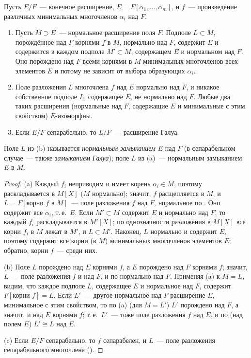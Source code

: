 \begin{proposition}
Пусть $E/F$~--- конечное расширение, $E=F[\alpha_1,\dots,\alpha_m]$, и $f$~--- произведение различных минимальных многочленов
$\alpha_i$ над $F$.
\begin{enumerate}[label=\textup{(\alph*)}]
\item Пусть $M\supset E$~--- нормальное расширение поля $F$. Подполе $L\subset M$, порождённое над $F$ корнями $f$ в $M$,
нормально над $F$, содержит $E$ и содержится в каждом подполе $M'\subset M$, содержащем $E$ и нормальном над $F$. Оно
порождено над $F$ всеми корнями в $M$ минимальных многочленов всех элементов $E$ и потому не зависит от выбора
образующих $\alpha_i$.
\item Поле разложения $L$ многочлена $f$ над $E$ нормально над $F$, и никакое собственное подполе $L$, содержащее $E$, не
нормально над $F$. Любые два таких расширения (нормальные над $F$, содержащие $E$ и минимальные с этим свойством)
$E$-изоморфны.
\item Если $E/F$ сепарабельно, то $L/F$~--- расширение Галуа.
\end{enumerate}
Поле $L$ из (b) называется \emph{нормальным замыканием} $E$ над $F$ (в сепарабельном случае~--- также \emph{замыканием
Галуа}); поле $L$ из (a)~--- нормальным замыканием $E$ в $M$.
\end{proposition}

\begin{proof}
(a) Каждый $f_i$ неприводим и имеет корень $\alpha_i\in M$, поэтому раскладывается в $M[X]$ ($M$ нормально); значит, $f$
расщепляется в $M$, и $L=F[\text{корни }f\text{ в }M]$~--- поле разложения $f$ над $F$, нормальное по . Оно
содержит все $\alpha_i$, т.\,е.\ $E$. Если $M'\subset M$ содержит $E$ и нормально над $F$, то каждый $f_i$ раскладывается в
$M'[X]$; по однозначности разложения в $M[X]$ все корни $f_i$ в $M$ лежат в $M'$, и $L\subset M'$. Наконец, $L$ нормально и
содержит $E$, поэтому содержит все корни (в $M$) минимальных многочленов элементов $E$; обратно, корни $f$~--- среди них.

(b) Поле $L$ порождено над $E$ корнями $f$, а $E$ порождено над $F$ корнями $f$; значит, $L$~--- поле разложения $f$ и над
$F$, и по  нормально над $F$. Применяя (a) к $M=L$, видим, что каждое подполе $L$, содержащее $E$ и нормальное
над $F$, содержит $F[\text{корни }f]=L$. Если $L'$~--- другое нормальное над $F$ расширение $E$, минимальное с этим
свойством, то по (a) (для $M=L'$) $L'$ порождено над $F$, а значит, и над $E$ корнями $f$; т.\,е.\ $L'$~--- тоже поле
разложения $f$ над $E$, и по  (над полем $E$) $L'\cong L$ над $E$.

(c) Если $E/F$ сепарабельно, то $f$ сепарабелен, и $L$~--- поле разложения сепарабельного многочлена ().
\end{proof}

